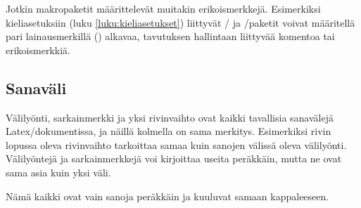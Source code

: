 
Jotkin makropaketit määrittelevät muitakin erikoismerkkejä. Esimerkiksi
kieli\-asetuksiin (luku \ref{luku:kieliasetukset}) liittyvät
\-/{} ja \-/paketit voivat
määritellä pari lainausmerkillä (\koodi{\textquotedbl}) alkavaa,
tavutuksen hallintaan liittyvää komentoa tai erikoismerkkiä.

\subsection{Sanaväli}
\label{luku:sanavali}

Välilyönti, sarkainmerkki ja yksi rivinvaihto ovat kaikki tavallisia
sanavälejä Latex\-/dokumentissa, ja näillä kolmella on sama merkitys.
Esimerkiksi rivin lopussa oleva rivinvaihto tarkoittaa samaa kuin
sanojen välissä oleva välilyönti. Välilyöntejä ja sarkainmerkkejä voi
kirjoittaa useita peräkkäin, mutta ne ovat sama asia kuin yksi väli.


\begin{koodilohkosis}
  Nämä      kaikki
       ovat            vain
  sanoja  peräkkäin  ja               kuuluvat
      samaan kappaleeseen.
\end{koodilohkosis}

